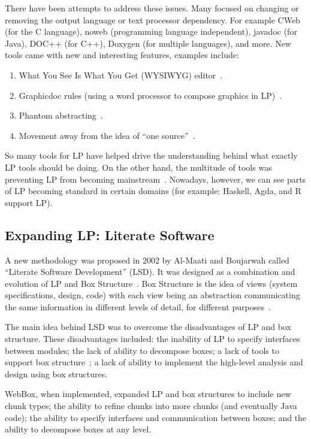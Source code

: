 \documentclass[preprint, 10pt]{sigplanconf}
\begin{document}
There have been attempts to address these issues. Many focused on changing or
removing the output language or text processor dependency. For example CWeb (for
the C language), noweb (programming language independent), javadoc (for Java),
DOC++ (for C++), Doxygen (for multiple languages), and more. New tools came with new and interesting features, examples include:

\begin{enumerate}
\item What You See Is What You Get (WYSIWYG)
editor~\cite{FritzsonGunnarssonAndJirstrand2002}.
\item Graphicdoc rules (using a word processor to compose graphics in
LP)~\cite{ShumAndCook1993}.
\item Phantom abstracting~\cite{ShumAndCook1993}.
\item Movement away from the idea of ``one source''~\cite{Simonis2003}.
\end{enumerate}

So many tools for LP have helped drive the understanding behind what exactly LP
tools should be doing. On the other hand, the multitude of tools was preventing
LP from becoming mainstream~\cite{Ramsey1994}. Nowadays, however, we can see
parts of LP becoming standard in certain domains (for example: Haskell, Agda,
and R support LP).

\subsection{Expanding LP: Literate Software}

A new methodology was proposed in 2002 by Al-Maati and Boujarwah called
``Literate Software Development'' (LSD). It was designed as a combination and
evolution of LP and Box Structure~\cite{AlMatiiAndBoujarwah2002}. Box Structure
is the idea of views (system specifications, design, code) with each view being
an abstraction communicating the same information in different levels of detail,
for different purposes~\cite{Mills1986}.

The main idea behind LSD was to overcome the disadvantages of LP and box
structure. These disadvantages included: the inability of LP to specify
interfaces between modules; the lack of ability to decompose boxes; a lack of
tools to support box structure~\cite{Deck1996}; a lack of ability to implement
the high-level analysis and design using box structures.

WebBox, when implemented, expanded LP and box structures to include new chunk
types; the ability to refine chunks into more chunks (and eventually Java code);
the ability to specify interfaces and communication between boxes; and the
ability to decompose boxes at any level.
\end{document}
